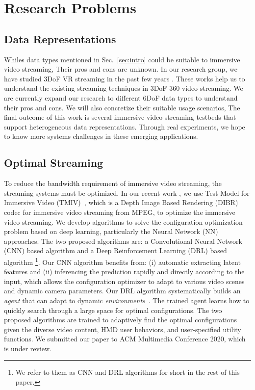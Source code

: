 \section{Research Problems}
\subsection{Data Representations}\label{sec:data_representation}

Whiles data types mentioned in Sec.~\ref{sec:intro} could be suitable to immersive video streaming,
Their pros and cons are unknown.
In our research group, we have studied 3DoF VR streaming in the past few years \cite{FYHH20,FLPH19}. 
These works help us to understand the existing streaming techniques in 3DoF 360{\degree} video streaming.
We are currently expand our research to different 6DoF data types to understand their pros and cons.
We will also concretize their suitable usage scenarios,
The final outcome of this work is several immersive video streaming testbeds that support heterogeneous data representations.
Through real experiments, we hope to know more systems challenges in these emerging applications.
\subsection{Optimal Streaming}\label{sec:optimal_streaming}

To reduce the bandwidth requirement of immersive video streaming, the streaming systems must be optimized.
In our recent work \cite{mm20_tr},
we use Test Model for Immersive Video (TMIV)~\cite{mpeg_N18470,mpeg_N18577,mpeg_N18795}, 
which is a Depth Image Based Rendering (DIBR) codec for immersive video streaming from MPEG, to optimize the immersive video streaming.
We develop algorithms to solve the configuration optimization problem based on deep learning, particularly the Neural Network (NN) approaches.
The two proposed algorithms are:
a Convolutional Neural Network (CNN) based algorithm and a Deep Reinforcement Learning (DRL) based algorithm
\footnote{We refer to them as CNN and DRL algorithms for short in the rest of this paper.}.
Our CNN algorithm benefits from: (i) automatic extracting latent features and 
(ii) inferencing the prediction rapidly and directly according to the input, which allows the configuration optimizer to 
adapt to various video scenes and dynamic camera parameters.
Our DRL algorithm systematically builds an {\em agent} that can adapt to dynamic {\em environments}~\cite{SB18,PZWL+19,HZZS18,CIZI+19}.
The trained agent learns how to quickly search through a large space for optimal configurations. 
The two proposed algorithms are
trained to adaptively find the optimal configurations given the diverse video content, HMD user behaviors, and user-specified utility functions.
We submitted our paper to ACM Multimedia Conference 2020, which is under review.

